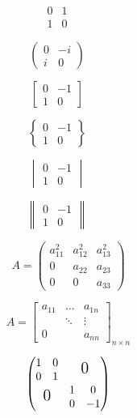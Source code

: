 \documentclass{ctexart}
\begin{document}
    \[
    \begin{matrix}
        0 & 1 \\
        1 & 0
    \end{matrix} \qquad
    \]

    \[
    \begin{pmatrix}
        0 & -i \\
        i & 0
    \end{pmatrix} \qquad
    \]

    \[
    \begin{bmatrix}
        0 & -1 \\
        1 & 0
    \end{bmatrix} \qquad
    \]

    \[
    \begin{Bmatrix}
        0 & -1 \\
        1 & 0
    \end{Bmatrix} \qquad
    \]

    \[
    \begin{vmatrix}
        0 & -1 \\
        1 & 0
    \end{vmatrix} \qquad
    \]

    \[
    \begin{Vmatrix}
        0 & -1 \\
        1 & 0
    \end{Vmatrix} \qquad
    \]


    \[
    A = \begin{pmatrix}
        a_{11}^2 & a_{12}^2 & a_{13}^2 \\
        0 & a_{22} & a_{23} \\
        0 & 0 & a_{33}
    \end{pmatrix}
    \]


    \[
    A = \begin{bmatrix}
        a_{11} & \dots & a_{1n} \\
        & \ddots & \vdots \\
        0 & & a_{nn}
    \end{bmatrix}_{n \times n}
    \]


    \[
    \begin{pmatrix}
        \begin{matrix} 1&0\\0&1 \end{matrix}
        & \text{\Large 0} \\
        \text{\Large 0} & \begin{matrix}
        1&0\\0&-1 \end{matrix}
    \end{pmatrix}
    \]
\end{document}
